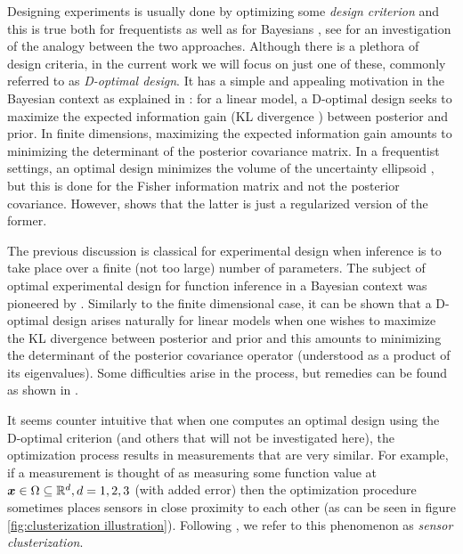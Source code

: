 \documentclass{amsart}
\numberwithin{equation}{section}
\begin{document}
Designing experiments is usually done by optimizing some \emph{design
  criterion} and this is true both for frequentists
\cite{Silvey13,Ucinski05} as well as for Bayesians
\cite{ChalonerVerdinelli95}, see \cite{ChalonerVerdinelli95} for an
investigation of the analogy between the two approaches. Although
there is a plethora of design criteria, in the current work we will
focus on just one of these, commonly referred to as \emph{D-optimal
  design}. It has a simple and appealing motivation in the Bayesian
context as explained in \cite{ChalonerVerdinelli95}: for a linear
model, a D-optimal design seeks to maximize the expected information
gain (KL divergence \cite{KullbackLeibler51,CoverThomas12}) between
posterior and prior. In finite dimensions, maximizing the expected
information gain amounts to minimizing the determinant of the
posterior covariance matrix. In a frequentist settings, an optimal
design minimizes the volume of the uncertainty ellipsoid \cite[page
  16]{Ucinski05}, but this is done for the Fisher information matrix
and not the posterior covariance. However, \cite{ChalonerVerdinelli95}
shows that the latter is just a regularized version of the former.

The previous discussion is classical for experimental design when
inference is to take place over a finite (not too large) number of
parameters. The subject of optimal experimental design for function
inference in a Bayesian context was pioneered by
\cite{AlexanderianGloorGhattas14,AlexanderianPetraStadlerEtAl16,
  AlexanderianPetraStadlerEtAl14}. Similarly to the finite dimensional
case, it can be shown that a D-optimal design arises naturally for
linear models when one wishes to maximize the KL divergence between
posterior and prior and this amounts to minimizing the determinant of
the posterior covariance operator (understood as a product of its
eigenvalues). Some difficulties arise in the process, but remedies can
be found as shown in \cite{AlexanderianGloorGhattas14}.

It seems counter intuitive that when one computes an optimal design
using the D-optimal criterion (and others that will not be
investigated here), the optimization process results in measurements
that are very similar. For example, if a measurement is thought of as
measuring some function value at ${\boldsymbol{x}} \in \Omega \subseteq \mathbb{R}^d,
d=1,2,3$ (with added error) then the optimization procedure sometimes
places sensors in close proximity to each other (as can be seen
in figure \ref{fig:clusterization illustration}). Following
\cite{Ucinski05}, we refer to this phenomenon as \emph{sensor
  clusterization}.
\end{document}
